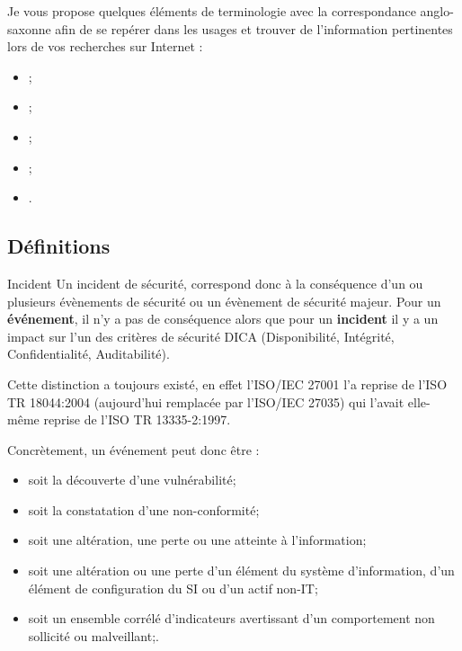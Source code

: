 Je vous propose quelques éléments de terminologie avec la correspondance anglo-saxonne afin de se repérer dans les usages et trouver de l'information pertinentes lors de vos recherches sur Internet :

\begin{itemize}
		\item {};
		\item{};
		\item {};
		\item {};
		\item {}.
\end{itemize}

\subsection{Définitions}

\begin{notebox}{Incident}
Un incident de sécurité, correspond donc à la conséquence d’un ou plusieurs évènements de sécurité ou un évènement de sécurité majeur. Pour un \textbf{événement}, il n'y a pas de conséquence alors que pour un \textbf{incident} il y a un impact sur l’un des critères de sécurité DICA (Disponibilité, Intégrité, Confidentialité, Auditabilité).
\end{notebox}

Cette distinction a toujours existé, en effet l'ISO/IEC 27001 l'a reprise de l'ISO TR 18044:2004 (aujourd'hui remplacée par l'ISO/IEC 27035) qui l'avait elle-même reprise de l'ISO TR 13335-2:1997. 

Concrètement, un événement peut donc être :

\begin{itemize}
  \item soit la découverte d’une vulnérabilité;
  \item  soit la constatation d’une non-conformité;
  \item soit une altération, une perte ou une atteinte à l’information;
  \item   soit une altération ou une perte d’un élément du système d’information, d’un élément de configuration du SI ou d’un actif non-IT;
  \item  soit un ensemble corrélé d'indicateurs avertissant d'un comportement non sollicité ou malveillant;.
\end{itemize}

